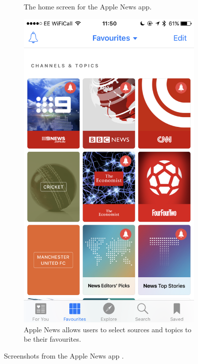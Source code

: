 \documentclass[12pt]{article}
\begin{document}
\begin{figure}[ht!]
\begin{subfigure}[t]{0.3\textwidth}
        \caption{The home screen for the Apple News app.}
        \label{AppleHome}
    \end{subfigure}
    \qquad
    \begin{subfigure}[t]{0.3\textwidth}
    \includegraphics[width=\textwidth]{AppleSources.PNG}
   \caption{Apple News allows users to select sources and topics to be their favourites.}
   \label{AppleSources}
   \end{subfigure}
   \caption[Screenshots from the Apple News app]{Screenshots from the Apple News app \cite{appleNews}.}
\end{figure}
\end{document}
